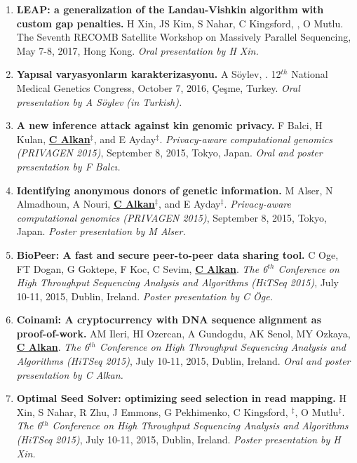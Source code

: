 \begin{enumerate}
\item
       {\bf LEAP: a generalization of the Landau-Vishkin algorithm with custom gap penalties.} H Xin, JS Kim, S Nahar, C Kingsford, \calkan{}, O Mutlu.
       The Seventh RECOMB Satellite Workshop on Massively Parallel Sequencing, May 7-8, 2017, Hong Kong.
       {\it Oral presentation by H Xin.}

\item
       {\bf Yapısal varyasyonların karakterizasyonu.} A Söylev, \calkan{}. 12$^{th}$ National Medical Genetics Congress, October 7, 2016, Çeşme, Turkey.
       {\it Oral presentation by A Söylev (in Turkish).}
       
\item
{\bf  A new inference attack against kin genomic privacy.}
F Balci, H Kulan, {\bf {\underline{C Alkan}}}$^\ddag$, and E Ayday$^\ddag$. 
{\em Privacy-aware computational genomics (PRIVAGEN 2015)}, 
 September 8, 2015, Tokyo, Japan. {\it Oral and poster presentation by F Balcı.}


 \item
{\bf Identifying anonymous donors of genetic information.}
M Alser, N Almadhoun, A Nouri, {\bf {\underline{C Alkan}}}$^\ddag$, and E Ayday$^\ddag$. 
{\em Privacy-aware computational genomics (PRIVAGEN 2015)}, 
 September 8, 2015, Tokyo, Japan. {\it Poster presentation by M Alser.}


\item
 {\bf BioPeer: A fast and secure peer-to-peer data sharing tool.}
  C Oge, FT Dogan, G Goktepe, F Koc, C Sevim, {\bf {\underline{C Alkan}}}.
{\em The 6$^{th}$ Conference on High Throughput Sequencing Analysis and Algorithms (HiTSeq 2015)}, 
July 10-11, 2015, Dublin, Ireland. {\it Poster presentation by C Öge.}

\item
 {\bf Coinami: A cryptocurrency with DNA sequence alignment as proof-of-work.}
  AM Ileri, HI Ozercan, A Gundogdu, AK Senol, MY Ozkaya, {\bf {\underline{C Alkan}}}.
{\em The 6$^{th}$ Conference on High Throughput Sequencing Analysis and Algorithms (HiTSeq 2015)}, 
July 10-11, 2015, Dublin, Ireland. {\it Oral and poster presentation by C Alkan.}



\item        
       {\bf Optimal Seed Solver: optimizing seed selection in read mapping.}
       H Xin, S Nahar, R Zhu, J Emmons, G Pekhimenko, C Kingsford, \calkan{}$^\ddag$, O Mutlu$^\ddag$.
{\em The 6$^{th}$ Conference on High Throughput Sequencing Analysis and Algorithms (HiTSeq 2015)}, 
July 10-11, 2015, Dublin, Ireland. {\it Poster presentation by H Xin.}




\end{enumerate}
